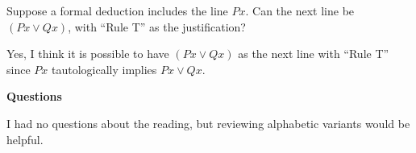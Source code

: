 \documentclass[english, 12pt]{amsart}
\begin{document}
\setlength{\headheight}{13.0pt}
\setlength{\footskip}{15.0pt}



\begin{problem}
  Suppose a formal deduction includes the line $Px$.
  Can the next line be $(Px \lor Qx)$, with
  ``Rule T'' as the justification?
  \begin{Answer}
    Yes, I think it is possible to have $(Px \lor Qx)$
    as the next line with ``Rule T''
    since $Px$ tautologically implies $Px \lor Qx$.
  \end{Answer}
\end{problem}

\step
  \begin{center}\textbf{Questions} \end{center}

  \step
  I had no questions about the reading,
  but reviewing alphabetic variants would be helpful.
\bigskip
\end{document}
